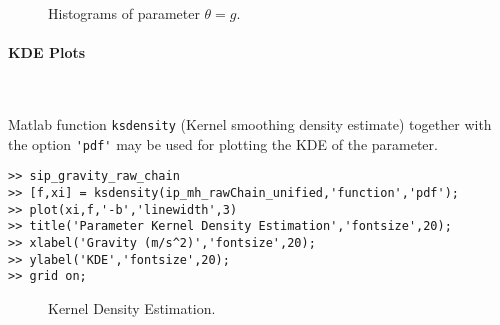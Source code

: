 \begin{figure}[p]
\centering 
{}
\vspace*{-10pt}
\caption{Histograms of parameter $\theta=g$. }
\end{figure}

\paragraph{KDE Plots} \

Matlab function \verb+ksdensity+ (Kernel smoothing density estimate) together with the option \verb+'pdf'+ may be used for plotting the KDE of the parameter.
\begin{lstlisting}[label=matlab:kde,caption={Matlab code for the KDE plot.}]
% inside Matlab
>> sip_gravity_raw_chain
>> [f,xi] = ksdensity(ip_mh_rawChain_unified,'function','pdf');
>> plot(xi,f,'-b','linewidth',3)
>> title('Parameter Kernel Density Estimation','fontsize',20);
>> xlabel('Gravity (m/s^2)','fontsize',20);
>> ylabel('KDE','fontsize',20);
>> grid on;
\end{lstlisting}

\begin{figure}[p]
\centering 
{}
\vspace*{-10pt}
\caption{Kernel Density Estimation. }
\end{figure}


